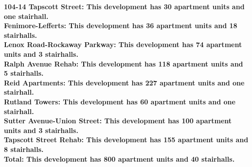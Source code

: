 \bf{104-14 Tapscott Street}: This development has 30 apartment units and one stairhall.\\\bf{Fenimore-Lefferts}: This development has 36 apartment units and 18 stairhalls.\\\bf{Lenox Road-Rockaway Parkway}: This development has 74 apartment units and 3 stairhalls.\\\bf{Ralph Avenue Rehab}: This development has 118 apartment units and 5 stairhalls.\\\bf{Reid Apartments}: This development has 227 apartment units and one stairhall.\\\bf{Rutland Towers}: This development has 60 apartment units and one stairhall.\\\bf{Sutter Avenue-Union Street}: This development has 100 apartment units and 3 stairhalls.\\\bf{Tapscott Street Rehab}: This development has 155 apartment units and 8 stairhalls.\\\bf{Total}: This development has 800 apartment units and 40 stairhalls.\\